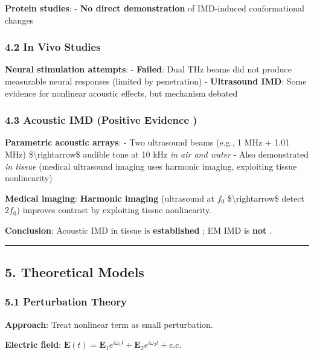 \textbf{Protein studies}: - \textbf{No direct demonstration} of
IMD-induced conformational changes

\subsubsection{4.2 In Vivo Studies}\label{in-vivo-studies}

\textbf{Neural stimulation attempts}: - \textbf{Failed}: Dual THz beams
did not produce measurable neural responses (limited by penetration) -
\textbf{Ultrasound IMD}: Some evidence for nonlinear acoustic effects,
but mechanism debated

\subsubsection{4.3 Acoustic IMD (Positive Evidence
)}\label{acoustic-imd-positive-evidence}

\textbf{Parametric acoustic arrays}: - Two ultrasound beams (e.g., 1 MHz
+ 1.01 MHz) \$\textbackslash rightarrow\$ audible tone at 10 kHz
\emph{in air and water} - Also demonstrated \emph{in tissue} (medical
ultrasound imaging uses harmonic imaging, exploiting tissue
nonlinearity)

\textbf{Medical imaging}: \textbf{Harmonic imaging} (ultrasound at
\(f_0\) \$\textbackslash rightarrow\$ detect \(2f_0\)) improves contrast
by exploiting tissue nonlinearity.

\textbf{Conclusion}: Acoustic IMD in tissue is \textbf{established} ; EM
IMD is \textbf{not} .

\begin{center}\rule{0.5\linewidth}{0.5pt}\end{center}

\subsection{5. Theoretical Models}\label{theoretical-models}

\subsubsection{5.1 Perturbation Theory}\label{perturbation-theory}

\textbf{Approach}: Treat nonlinear term as small perturbation.

\textbf{Electric field}:
\(\mathbf{E}(t) = \mathbf{E}_1 e^{i\omega_1 t} + \mathbf{E}_2 e^{i\omega_2 t} + \text{c.c.}\)

